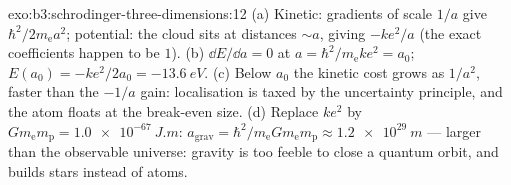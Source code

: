\begin{solution}{exo:b3:schrodinger-three-dimensions:12}
(a) Kinetic: gradients of scale $1/a$ give $\hbar^2/2m_{\text{e}}
a^2$; potential: the cloud sits at distances $\sim a$, giving
$-ke^2/a$ (the exact coefficients happen to be $1$). (b) $\dd E/\dd
a = 0$ at $a = \hbar^2/m_{\text{e}}ke^2 = a_0$; $E(a_0) =
-ke^2/2a_0 = \qty{-13.6}{eV}$. (c) Below $a_0$ the kinetic cost
grows as $1/a^2$, faster than the $-1/a$ gain: localisation is
taxed by the uncertainty principle, and the atom floats at the
break-even size. (d) Replace $ke^2$ by $Gm_{\text{e}}m_{\text{p}} =
\qty{1.0e-67}{J.m}$: $a_{\text{grav}} = \hbar^2/m_{\text{e}}G
m_{\text{e}}m_{\text{p}} \approx \qty{1.2e29}{m}$ --- larger than
the observable universe: gravity is too feeble to close a quantum
orbit, and builds stars instead of atoms.
\end{solution}

